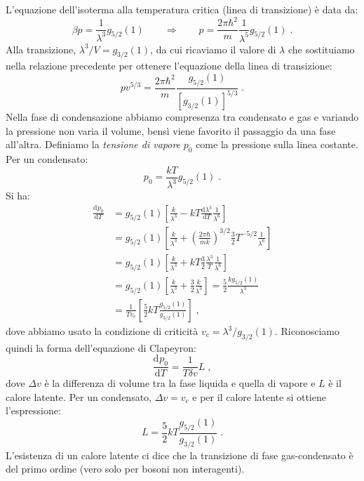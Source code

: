 \documentclass[10pt,a4paper]{report}
\theoremstyle{definition}
\newcommand{\dev}[3][]{\frac{\mathrm{d}^{#1} #2}{\mathrm{d} #3^{#1}}}
\numberwithin{equation}{section}
\newcommand{\diff}[1][]{\mathrm{d}#1}
\begin{document}
L'equazione dell'isoterma alla temperatura critica (linea di transizione) è data da:
$$
\beta p=\frac{1}{\lambda^3}g_{5/2}(1)\qquad\Longrightarrow\qquad p=\frac{2\pi\hbar^2}{m}\frac{1}{\lambda^5}g_{5/2}(1)\;.
$$
Alla transizione, $\lambda^3/V=g_{3/2}(1)$, da cui ricaviamo il valore di $\lambda$ che sostituiamo nella relazione precedente per ottenere l'equazione della linea di transizione:
\begin{equation}
pv^{5/3}=\frac{2\pi\hbar^2}{m}\frac{g_{5/2}(1)}{[g_{3/2}(1)]^{5/3}}\;.
\end{equation}
Nella fase di condensazione abbiamo compresenza tra condensato e gas e variando la pressione non varia il volume, bensì viene favorito il passaggio da una fase all'altra. Definiamo la \emph{tensione di vapore} $p_0$ come la pressione sulla linea costante. Per un condensato:
\begin{equation}
p_0=\frac{kT}{\lambda^3}g_{5/2}(1)\;.
\end{equation}
Si ha:
\begin{align*}
\dev{p_0}{T} &= g_{5/2}(1)\left[\frac{k}{\lambda^3}-kT\frac{\diff{\lambda^3}}{\diff{T}}\frac{1}{\lambda^6}\right] \\
&= g_{5/2}(1)\left[\frac{k}{\lambda^3}+\left(\frac{2\pi\hbar}{mk}\right)^{3/2}\frac{3}{2}T^{-5/2}\frac{1}{\lambda^6}\right] \\
&= g_{5/2}(1)\left[\frac{k}{\lambda^3}+kT\frac{3}{2}\frac{\lambda^3}{T}\frac{1}{\lambda^6}\right] \\
&= g_{5/2}(1)\left[\frac{k}{\lambda^3}+\frac{3}{2}\frac{k}{\lambda^3}\right]=\frac{5}{2}\frac{kg_{5/2}(1)}{\lambda^3}\\
&=\frac{1}{Tv_c}\left[\frac{5}{2}kT\frac{g_{5/2}(1)}{g_{3/2}(1)}\right]\;,
\end{align*}
dove abbiamo usato la condizione di criticità $v_c=\lambda^3/g_{3/2}(1)$. Riconosciamo quindi la forma dell'equazione di Clapeyron:
\begin{equation}
\dev{p_0}{T}=\frac{1}{T\delta v}L\;,
\end{equation}
dove $\Delta v$ è la differenza di volume tra la fase liquida e quella di vapore e $L$ è il calore latente. Per un condensato, $\Delta v=v_c$ e per il calore latente si ottiene l'espressione:
\begin{equation}
L=\frac{5}{2}kT\frac{g_{5/2}(1)}{g_{3/2}(1)}\;.
\end{equation}
L'esistenza di un calore latente ci dice che la transizione di fase gas-condensato è del primo ordine (vero solo per bosoni non interagenti).
\end{document}
